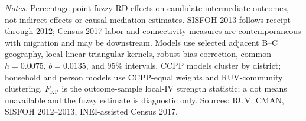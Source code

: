 \begin{minipage}{0.98\linewidth}\footnotesize\textit{Notes:} Percentage-point fuzzy-RD effects on candidate intermediate outcomes, not indirect effects or causal mediation estimates. SISFOH 2013 follows receipt through 2012; Census 2017 labor and connectivity measures are contemporaneous with migration and may be downstream. Models use selected adjacent B--C geography, local-linear triangular kernels, robust bias correction, common \(h=0.0075\), \(b=0.0135\), and 95\% intervals. CCPP models cluster by district; household and person models use CCPP-equal weights and RUV-community clustering. \(F_{\mathrm{KP}}\) is the outcome-sample local-IV strength statistic; a dot means unavailable and the fuzzy estimate is diagnostic only. Sources: RUV, CMAN, SISFOH 2012--2013, INEI-assisted Census 2017.\end{minipage}
\endgroup
